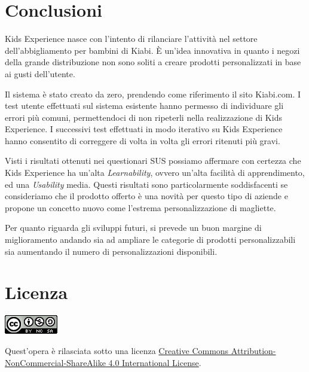 \documentclass[12pt,italian,]{report}
\begin{document}
\newpage
\section{Conclusioni}

Kids Experience nasce con l'intento di rilanciare l'attività nel settore dell'abbigliamento per bambini di Kiabi. 
È un'idea innovativa in quanto i negozi della grande distribuzione non sono soliti a creare prodotti personalizzati in base ai gusti dell'utente. 

Il sistema è stato creato da zero, prendendo come riferimento il sito Kiabi.com. 
I test utente effettuati sul sistema esistente hanno permesso di individuare gli errori più comuni, permettendoci di non ripeterli nella realizzazione di Kids Experience.
I successivi test effettuati in modo iterativo su Kids Experience hanno consentito di correggere di volta in volta gli errori ritenuti più gravi.

Visti i risultati ottenuti nei questionari SUS possiamo affermare con certezza che Kids Experience ha un'alta \emph{Learnability}, ovvero un'alta facilità di apprendimento, ed una \emph{Usability} media. Questi risultati sono particolarmente soddisfacenti se consideriamo che il prodotto offerto è una novità per questo tipo di aziende e propone un concetto nuovo come l'estrema personalizzazione di magliette.

Per quanto riguarda gli sviluppi futuri, si prevede un buon margine di miglioramento andando sia ad ampliare le categorie di prodotti personalizzabili sia aumentando il numero di personalizzazioni disponibili.

\newpage
\section{Licenza}\label{licenza}

\includegraphics{img/licenza.png}

Quest'opera è rilasciata sotto una licenza
\href{https://creativecommons.org/licenses/by-nc-sa/4.0/}{Creative
Commons Attribution-NonCommercial-ShareAlike 4.0 International License}.
\end{document}
